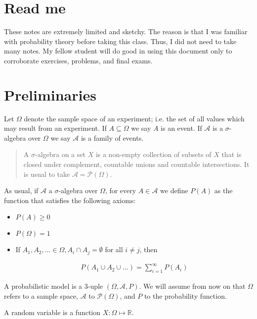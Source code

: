 \documentclass[a4paper, 12pt]{article}
\begin{document}
\section{Read me}

These notes are extremely limited and sketchy. The reason is that I was familiar
with probability theory before taking this class. Thus, I did not need to take
many notes. My fellow student will do good in using this document only to
corroborate exercises, problems, and final exams. 

\section{Preliminaries}

Let $\Omega$ denote the sample space of an experiment; i.e. the set of all
values which may result from an experiment. If $A \subseteq \Omega$ we say $A$
is an event. If $\mathcal{A}$ is a $\sigma$-algebra over $\Omega$ we say
$\mathcal{A}$ is a family of events. 

\begin{quote}
    A $\sigma$-algebra on a set $X$ is a non-empty collection of subsets of $X$
    that is closed under complement, countable unions and countable
    intersections. It is usual to take $\mathcal{A} = \mathcal{P}(\Omega)$.
\end{quote}

As usual, if $\mathcal{A}$ a $\sigma$-algebra over $\Omega$, for every $A \in
\mathcal{A}$ we define $P(A)$ as the function that satisfies the following
axioms: 

\begin{itemize}
    \item $P(A) \geq 0$ 
    \item $P(\Omega) = 1$ 
    \item If $A_1, A_2, \ldots \in \Omega, A_i \cap A_j = \emptyset$  for all
        $i \neq j$, then 

        \begin{align*}
            P(A_1 \cup A_2 \cup  \ldots) = \sum_{i=1}^{\infty} P(A_i)
        \end{align*}
\end{itemize}

A probabilistic model is a 3-uple $(\Omega, \mathcal{A}, P)$. We will assume
from now on that $\Omega$ refers to a sample space, $\mathcal{A}$ to
$\mathcal{P}(\Omega)$, and $P$ to the probability function.

A random variable is a function $X : \Omega \mapsto \mathbb{R}$.
\end{document}
